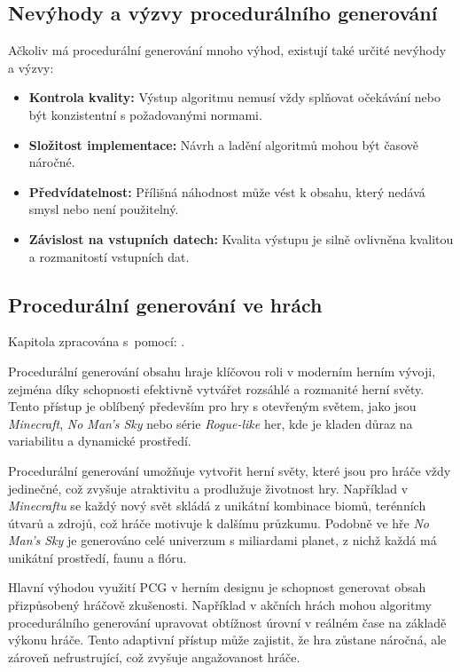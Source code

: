 \subsection{Nevýhody a výzvy procedurálního generování}
Ačkoliv má procedurální generování mnoho výhod, existují také určité nevýhody a výzvy:
\begin{itemize}
    \item \textbf{Kontrola kvality:} Výstup algoritmu nemusí vždy splňovat očekávání nebo být konzistentní s požadovanými normami.
    \item \textbf{Složitost implementace:} Návrh a ladění algoritmů mohou být časově náročné.
    \item \textbf{Předvídatelnost:} Přílišná náhodnost může vést k obsahu, který nedává smysl nebo není použitelný.
    \item \textbf{Závislost na vstupních datech:} Kvalita výstupu je silně ovlivněna kvalitou a rozmanitostí vstupních dat.
\end{itemize}

\subsection{Procedurální generování ve hrách}

Kapitola zpracována s~pomocí: \cite{PCGinG} \cite{HistoryOfPCG}.

Procedurální generování obsahu hraje klíčovou roli v moderním herním vývoji, zejména díky schopnosti efektivně vytvářet rozsáhlé a rozmanité herní světy. Tento přístup je oblíbený především pro hry s otevřeným světem, jako jsou \emph{Minecraft}, \emph{No Man's Sky} nebo série \emph{Rogue-like} her, kde je kladen důraz na variabilitu a dynamické prostředí.

Procedurální generování umožňuje vytvořit herní světy, které jsou pro hráče vždy jedinečné, což zvyšuje atraktivitu a prodlužuje životnost hry. Například v \emph{Minecraftu} se každý nový svět skládá z unikátní kombinace biomů, terénních útvarů a zdrojů, což hráče motivuje k dalšímu průzkumu. Podobně ve hře \emph{No Man's Sky} je generováno celé univerzum s miliardami planet, z nichž každá má unikátní prostředí, faunu a flóru.

Hlavní výhodou využití PCG v herním designu je schopnost generovat obsah přizpůsobený hráčově zkušenosti. Například v akčních hrách mohou algoritmy procedurálního generování upravovat obtížnost úrovní v reálném čase na základě výkonu hráče. Tento adaptivní přístup může zajistit, že hra zůstane náročná, ale zároveň nefrustrující, což zvyšuje angažovanost hráče.

